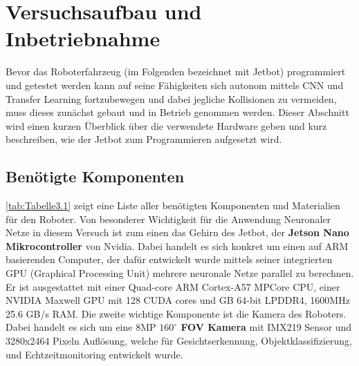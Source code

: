 \section{Versuchsaufbau und Inbetriebnahme} \label{sec:versuchsaufbau}

Bevor das Roboterfahrzeug (im Folgenden bezeichnet mit \glqq Jetbot\grqq{}) programmiert und getestet werden kann auf seine Fähigkeiten sich autonom mittels CNN und Transfer Learning fortzubewegen und dabei jegliche Kollisionen zu vermeiden, muss dieses zunächst gebaut und in Betrieb genommen werden. Dieser Abschnitt wird einen kurzen Überblick über die verwendete Hardware geben und kurz beschreiben, wie der Jetbot zum Programmieren aufgesetzt wird. 

\subsection{Benötigte Komponenten}

\autoref{tab:Tabelle3.1} zeigt eine Liste aller benötigten Komponenten und Materialien für den Roboter. Von besonderer Wichtigkeit für die Anwendung Neuronaler Netze in diesem Versuch ist zum einen das Gehirn des Jetbot, der \textbf{Jetson Nano Mikrocontroller} von Nvidia. Dabei handelt es sich konkret um einen auf ARM basierenden Computer, der dafür entwickelt wurde mittels seiner integrierten GPU (Graphical Processing Unit) mehrere neuronale Netze parallel zu berechnen. Er ist ausgestattet mit einer Quad-core ARM Cortex-A57 MPCore CPU, einer NVIDIA Maxwell GPU mit 128 CUDA cores und GB 64-bit LPDDR4, 1600MHz 25.6 GB/s RAM. Die zweite wichtige Komponente ist die Kamera des Roboters. Dabei handelt es sich um eine 8MP \textbf{$160^\circ$ FOV Kamera} mit IMX219 Sensor und 3280x2464 Pixeln Auflösung, welche für Gesichtserkennung, Objektklassifizierung, und Echtzeitmonitoring entwickelt wurde.

